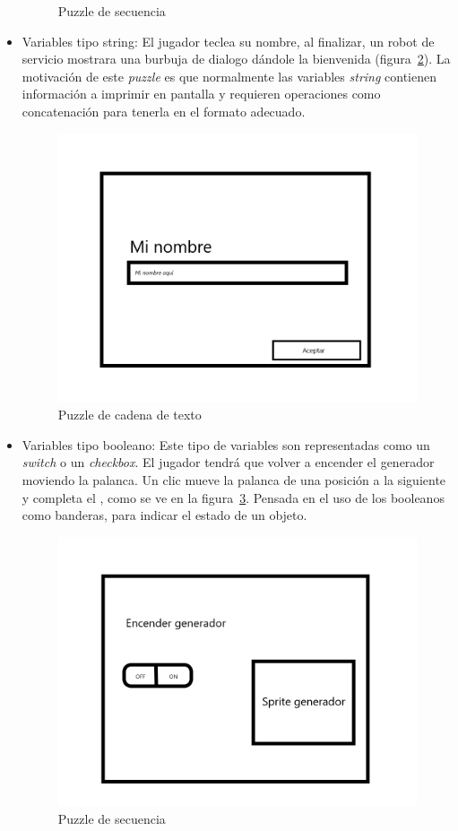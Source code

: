 \begin{itemize}
\begin{figure}[H]
        \caption{Puzzle de secuencia}
        \label{fig:puzzle_secuencia}
    \end{figure}
    \item Variables tipo string: El jugador teclea su nombre, al finalizar, un robot de servicio mostrara una burbuja de dialogo dándole la bienvenida (figura~\ref{fig:puzzle_string}). La motivación de este \textit{puzzle} es que normalmente las variables \textit{string} contienen información a imprimir en pantalla y requieren operaciones como concatenación para tenerla en el formato adecuado.
        \begin{figure}[H]
        \centering
        \includegraphics[width=0.5\linewidth]{images/PuzzleString.png}
        \caption{Puzzle de cadena de texto}
        \label{fig:puzzle_string}
    \end{figure}
    \item  Variables tipo booleano: Este tipo de variables son representadas como un \textit{switch} o un \textit{checkbox}. El jugador tendrá que volver a encender el generador moviendo la palanca. Un clic mueve la palanca de una posición a la siguiente y completa el , como se ve en la figura~\ref{fig:puzzle_booleano}. Pensada en el uso de los booleanos como banderas, para indicar el estado de un objeto. 
    \begin{figure}[H]
        \centering
        \includegraphics[width=0.5\linewidth]{images/SabotageGenerador.png}
        \caption{Puzzle de secuencia}
        \label{fig:puzzle_booleano}
    \end{figure}

\end{itemize}
